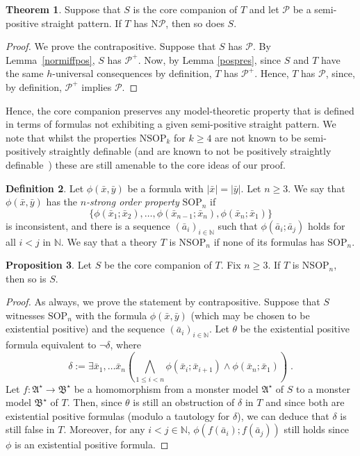 \documentclass{amsart}
\theoremstyle{definition}
\newtheorem{theorem}{Theorem}[section]
\newtheorem{definition}[theorem]{Definition}
\newtheorem{proposition}[theorem]{Proposition}
\theoremstyle{remark}
\numberwithin{equation}{section}
\newcommand{\fa}{\mathfrak{A}}
\newcommand{\fb}{\mathfrak{B}}
\begin{document}
\begin{theorem}\label{thm:inheritance} Suppose that $S$ is the core companion  of $T$ and let $\mathcal{P}$ be a semi-positive straight pattern. If $T$ has $\mathrm{N}\mathcal{P}$, then so does $S$.
\end{theorem}
\begin{proof} We prove the contrapositive. Suppose that $S$ has $\mathcal{P}$. By Lemma~\ref{normiffpos}, $S$ has $\mathcal{P}^+$. Now, by Lemma \ref{pospres}, since $S$ and $T$ have the same $h$-universal consequences by definition, $T$ has $\mathcal{P}^+$. Hence, $T$ has $\mathcal{P}$, since, by definition, $\mathcal{P}^+$ implies $\mathcal{P}$.
\end{proof}

Hence, the core companion  preserves any model-theoretic property that is defined in terms of formulas not exhibiting a given semi-positive straight pattern. We note that whilst the properties $\mathrm{NSOP}_k$ for $k\geq 4$ are
not known to be semi-positively straightly definable (and are known to not be positively straightly definable~\cite{bailetti2024walk}) these are still amenable to the core ideas of our proof.


\begin{definition}\label{def:NSOPn} Let $\phi(\bar{x},\bar{y})$ be a formula with $|\bar{x}|=|\bar{y}|$. Let $n\geq 3$. We say that $\phi(\bar{x},\bar{y})$ has the \emph{$n$-strong order property} $\mathrm{SOP}_n$ if
\[\{\phi(\bar{x}_1; \bar{x}_2), \dots,\phi(\bar{x}_{n-1}; \bar{x}_{n}), \phi(\bar{x}_n; \bar{x}_1)\} \]
is inconsistent, and there is a sequence $(\bar{a}_i)_{i\in\mathbb{N}}$ such that $\phi(\bar{a}_i; \bar{a}_j)$ holds for all $i<j$ in $\mathbb{N}$. We say that  a theory $T$ is $\mathrm{NSOP}_n$ if none of its formulas has $\mathrm{SOP}_n$.
\end{definition}

\begin{proposition}\label{prop:nsopn} Let $S$ be the core companion  of $T$. Fix $n\geq 3$. If $T$ is $\mathrm{NSOP}_n$, then so is $S$.
\end{proposition}
\begin{proof} As always, we prove the statement by contrapositive. Suppose that $S$ witnesses $\mathrm{SOP}_n$ with the formula $\phi(\bar{x},\bar{y})$ (which may be chosen to be existential positive) and the sequence $(\bar{a}_i)_{i\in\mathbb{N}}$. Let 
$\theta$ be the existential positive formula equivalent to $\neg\delta$, 
where
\[\delta:=\exists \bar{x}_1, \dots \bar{x}_n \left(\bigwedge_{1\leq i<n} \phi(\bar{x}_i; \bar{x}_{i+1})\wedge\phi(\bar{x}_n; \bar{x}_1)\right)\;.\]
Let $f \colon\fa^\star\to\fb^\star$ be a homomorphism from a monster model $\fa^\star$ of $S$ to a monster model $\fb^\star$ of $T$. Then, since $\theta$ is still an obstruction of $\delta$ in $T$ and since both are existential positive formulas (modulo a tautology for $\delta$), we can deduce that $\delta$ is still false in $T$. Moreover, for any $i<j\in\mathbb{N}$, $\phi(f(\bar{a}_i); f(\bar{a}_{j}))$ still holds since $\phi$ is an existential positive formula.
\end{proof}
\end{document}
